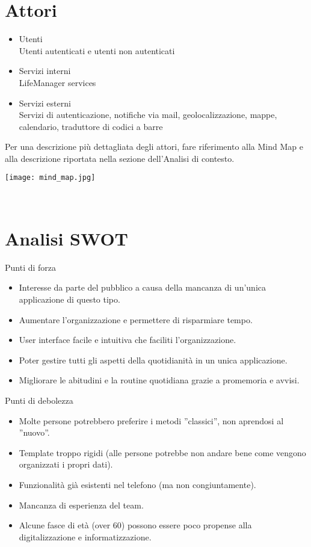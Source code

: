 \documentclass[a4paper,12pt]{article}
\begin{document}
\section*{Attori}
\begin{itemize}
 \setlength\itemsep{0.01em}
\item {\sffamily  Utenti}
\\ Utenti autenticati e utenti non autenticati
\item {\sffamily  Servizi interni}
\\ LifeManager services
\item {\sffamily  Servizi esterni}
\\ Servizi di autenticazione, notifiche via mail, geolocalizzazione, mappe, calendario, traduttore di codici a barre
\end{itemize}


Per una descrizione più dettagliata degli attori, fare riferimento alla Mind Map e alla descrizione riportata nella sezione dell'Analisi di contesto.


\begin{center}
  \texttt{[image: mind\_map.jpg]}
\end{center}

\
\section*{Analisi SWOT}
{\sffamily  Punti di forza}
\begin{itemize} \setlength\itemsep{0.01em}
\item Interesse da parte del pubblico a causa della mancanza di un'unica applicazione di questo tipo.
\item Aumentare l'organizzazione e permettere di risparmiare tempo.
\item User interface facile e intuitiva che faciliti l'organizzazione.
\item Poter gestire tutti gli aspetti della quotidianità in un unica applicazione.
\item Migliorare le abitudini e la routine quotidiana grazie a promemoria e avvisi.
\end{itemize}

{\sffamily  Punti di debolezza}
\begin{itemize} \setlength\itemsep{0.01em}
\item Molte persone potrebbero preferire i metodi ''classici'', non aprendosi al ''nuovo''.
\item Template troppo rigidi (alle persone potrebbe non andare bene come vengono organizzati i propri dati).
\item Funzionalità già esistenti nel telefono (ma non congiuntamente).
\item Mancanza di esperienza del team.
\item Alcune fasce di età (over 60) possono essere poco propense alla digitalizzazione e informatizzazione.
\end{itemize}
\end{document}

